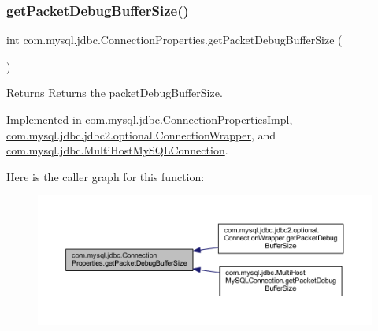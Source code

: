 \subsubsection{\texorpdfstring{get\+Packet\+Debug\+Buffer\+Size()}{getPacketDebugBufferSize()}}
{\footnotesize\ttfamily int com.\+mysql.\+jdbc.\+Connection\+Properties.\+get\+Packet\+Debug\+Buffer\+Size (\begin{DoxyParamCaption}{ }\end{DoxyParamCaption})}

\begin{DoxyReturn}{Returns}
Returns the packet\+Debug\+Buffer\+Size. 
\end{DoxyReturn}


Implemented in \mbox{\hyperlink{classcom_1_1mysql_1_1jdbc_1_1_connection_properties_impl_a45fef9850f118c93dac5b44059f015bf}{com.\+mysql.\+jdbc.\+Connection\+Properties\+Impl}}, \mbox{\hyperlink{classcom_1_1mysql_1_1jdbc_1_1jdbc2_1_1optional_1_1_connection_wrapper_ad3f5f474a7148a078c7cb5ff6b9b1a9d}{com.\+mysql.\+jdbc.\+jdbc2.\+optional.\+Connection\+Wrapper}}, and \mbox{\hyperlink{classcom_1_1mysql_1_1jdbc_1_1_multi_host_my_s_q_l_connection_a7201e5e89691f622bba29279e5e49ffb}{com.\+mysql.\+jdbc.\+Multi\+Host\+My\+S\+Q\+L\+Connection}}.

Here is the caller graph for this function\+:\nopagebreak
\begin{figure}[H]
\begin{center}
\leavevmode
\includegraphics[width=350pt]{interfacecom_1_1mysql_1_1jdbc_1_1_connection_properties_ad21609c6c63ee0b69b4abdd5c4c7f39c_icgraph}
\end{center}
\end{figure}
\mbox{\label{interfacecom_1_1mysql_1_1jdbc_1_1_connection_properties_ad0bf062f59dcc82790e2d539c3a79924}} 
